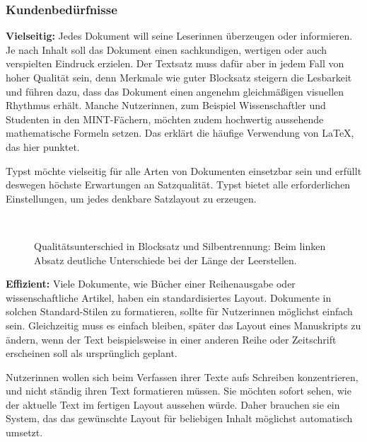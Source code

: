 \documentclass[11pt, a4paper]{article}
\newcommand{\gender}{\raisebox{-.25em}{*}}
\renewcommand{\glossary} {\marginsymbol{\textbf{↪}}}
\newcommand{\marginsymbol}[1] {\protect\marginsymbolhelper{#1}}
\newcommand{\marginsymbolhelper}[1] {\tabto*{-1cm}\makebox[0cm]{#1}\tabto*{\TabPrevPos}}
\begin{document}
\subsubsection*{Kundenbedürfnisse}


\textbf{Vielseitig:} Jedes Dokument will seine Leser\gender{}innen überzeugen oder informieren. Je nach Inhalt soll das Dokument einen sachkundigen, wertigen oder auch verspielten Eindruck erzielen. Der Textsatz muss dafür aber in jedem Fall von hoher Qualität sein, denn Merkmale wie guter \glossary Blocksatz steigern die Lesbarkeit und führen dazu, dass das Dokument einen angenehm gleichmäßigen visuellen Rhythmus erhält. Manche Nutzer\gender{}innen, zum Beispiel Wissenschaftler und Studenten in den \glossary MINT-Fächern, möchten zudem hochwertig aussehende mathematische Formeln setzen. Das erklärt die häufige Verwendung von LaTeX, das hier punktet.

Typst möchte vielseitig für alle Arten von Dokumenten einsetzbar sein und erfüllt deswegen höchste Erwartungen an Satzqualität. Typst bietet alle erforderlichen Einstellungen, um jedes denkbare Satzlayout zu erzeugen.

\begin{figure}
    \centering
    ~ %
    \caption{Qualitätsunterschied in Blocksatz und Silbentrennung: 
  Beim linken Absatz deutliche Unterschiede bei der Länge der Leerstellen.}
\end{figure}

\textbf{Effizient:} Viele Dokumente, wie Bücher einer Reihenausgabe oder wissenschaftliche Artikel, haben ein standardisiertes Layout. Dokumente in solchen Standard-Stilen zu formatieren, sollte für Nutzer\gender{}innen möglichst einfach sein. Gleichzeitig muss es einfach bleiben, später das Layout eines Manuskripts zu ändern, wenn der Text beispielsweise in einer anderen Reihe oder Zeitschrift erscheinen soll als ursprünglich geplant.

Nutzer\gender{}innen wollen sich beim Verfassen ihrer Texte aufs Schreiben konzentrieren, und nicht  ständig ihren Text formatieren müssen. Sie möchten sofort sehen, wie der aktuelle Text im fertigen Layout aussehen würde. Daher brauchen sie ein System, das das gewünschte Layout für beliebigen Inhalt möglichst automatisch umsetzt.
\end{document}
